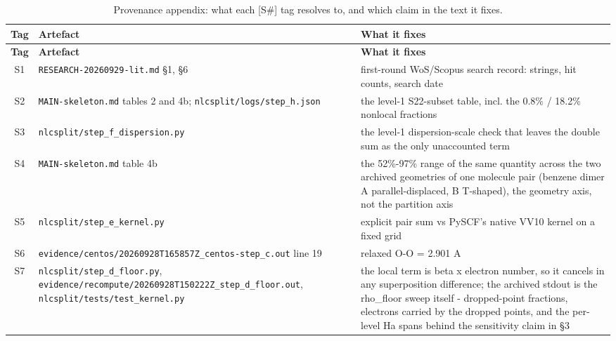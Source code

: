 \documentclass[11pt]{article}
\begin{document}
\footnotesize
\begin{longtable}{c>{\raggedright\arraybackslash}p{}>{\raggedright\arraybackslash}p{}}
\caption{Provenance appendix: what each [S\#] tag resolves to, and which claim in the text it fixes.}
\label{tab:5}\\
\toprule
\textbf{Tag} & \textbf{Artefact} & \textbf{What it fixes} \\ \midrule
\endfirsthead
\toprule
\textbf{Tag} & \textbf{Artefact} & \textbf{What it fixes} \\ \midrule
\endhead
\bottomrule
\endfoot
S1 & \texttt{RESEARCH-20260929-lit.md} \S{}1, \S{}6 & first-round WoS/Scopus search record: strings, hit counts, search date \\
S2 & \texttt{MAIN-skeleton.md} tables 2 and 4b; \texttt{nlcsplit/logs/step\_h.json} & the level-1 S22-subset table, incl. the 0.8\% / 18.2\% nonlocal fractions \\
S3 & \texttt{nlcsplit/\allowbreak{}step\_\allowbreak{}f\_\allowbreak{}dispersion.py} & the level-1 dispersion-scale check that leaves the double sum as the only unaccounted term \\
S4 & \texttt{MAIN-skeleton.md} table 4b & the 52\%-97\% range of the same quantity across the two archived geometries of one molecule pair (benzene dimer A parallel-displaced, B T-shaped), the geometry axis, not the partition axis \\
S5 & \texttt{nlcsplit/step\_e\_kernel.py} & explicit pair sum vs PySCF's native VV10 kernel on a fixed grid \\
S6 & \texttt{evidence/\allowbreak{}centos/\allowbreak{}20260928T165857Z\_\allowbreak{}centos-step\_\allowbreak{}c.out} line 19 & relaxed O-O = 2.901 A \\
S7 & \texttt{nlcsplit/step\_d\_floor.py}, \texttt{evidence/\allowbreak{}recompute/\allowbreak{}20260928T150222Z\_\allowbreak{}step\_\allowbreak{}d\_\allowbreak{}floor.out}, \texttt{nlcsplit/\allowbreak{}tests/\allowbreak{}test\_\allowbreak{}kernel.py} & the local term is beta x electron number, so it cancels in any superposition difference; the archived stdout is the rho\_floor sweep itself - dropped-point fractions, electrons carried by the dropped points, and the per-level Ha spans behind the sensitivity claim in \S{}3 \\

\end{longtable}
\end{document}
